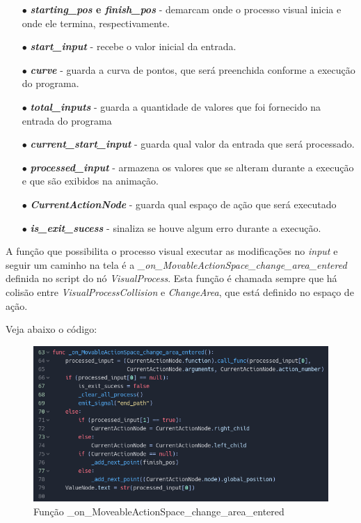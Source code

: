 \begin{itemize}
    \item[$\bullet$]
        \textbf{\textit{starting\_pos} e \textit{finish\_pos}} - demarcam onde o 
        processo visual inicia e onde ele termina, respectivamente.
    \item[$\bullet$]
        \textbf{\textit{start\_input}} - recebe o valor inicial da entrada.
    \item[$\bullet$]
        \textbf{\textit{curve}} - guarda a curva 
        de pontos, que será preenchida conforme a execução do programa.
    \item[$\bullet$] 
        \textbf{\textit{total\_inputs}} - guarda a quantidade de valores que foi 
        fornecido na entrada do programa
    \item[$\bullet$]
        \textbf{\textit{current\_start\_input}} - guarda qual valor da entrada que será
        processado.
    \item[$\bullet$]
        \textbf{\textit{processed\_input}} - armazena os 
        valores que se alteram durante a execução e que são exibidos na 
        animação.
    \item[$\bullet$] 
        \textbf{\textit{CurrentActionNode}} - guarda qual espaço de ação que será
        executado
    \item[$\bullet$] 
        \textbf{\textit{is\_exit\_sucess}} - sinaliza se houve algum erro 
        durante a execução.
\end{itemize}

A função que possibilita o processo visual executar as modificações no 
\textit{input} e seguir um caminho na tela é a
\textit{\_on\_MovableActionSpace\_change\_area\_entered} definida no script do
nó \textit{VisualProcess}. Esta função é chamada sempre que há colisão entre 
\textit{VisualProcessCollision} e \textit{ChangeArea}, que está definido no 
espaço de ação.

Veja abaixo o código:

\begin{figure}[H]
    \includegraphics[width=\textwidth]{../figuras/codigo_MovableActionSpace_area_entered.png}
    \caption{Função \_on\_MoveableActionSpace\_change\_area\_entered}
\end{figure}

